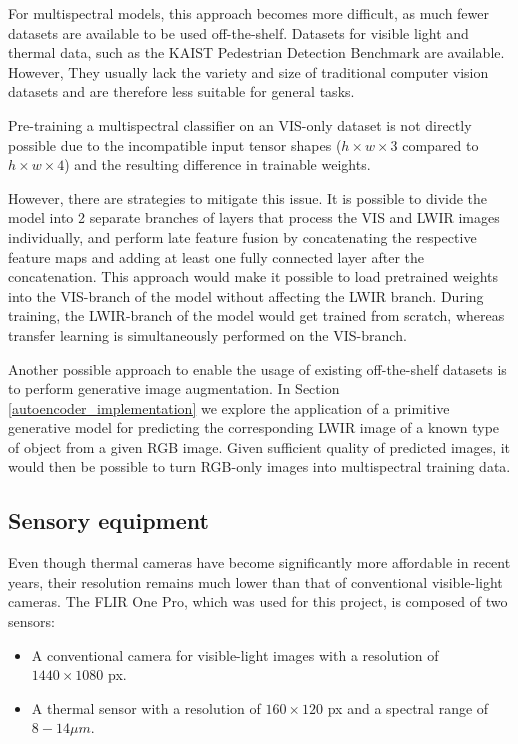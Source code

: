 \documentclass{l4proj}
\begin{document}
For multispectral models, this approach becomes more difficult, as much fewer datasets are available to be used off-the-shelf. Datasets for visible light and thermal data, such as the KAIST Pedestrian Detection Benchmark \citep{hwang_multispectral_2015} are available. However, They usually lack the variety and size of traditional computer vision datasets and are therefore less suitable for general tasks.

Pre-training a multispectral classifier on an VIS-only dataset is not directly possible due to the incompatible input tensor shapes ($h \times w \times 3$ compared to $h \times w \times 4$) and the resulting difference in trainable weights.

However, there are strategies to mitigate this issue. It is possible to divide the model into 2 separate branches of layers that process the VIS and LWIR images individually, and perform late feature fusion by concatenating the respective feature maps and adding at least one fully connected layer after the concatenation. This approach would make it possible to load pretrained weights into the VIS-branch of the model without affecting the LWIR branch. During training, the LWIR-branch of the model would get trained from scratch, whereas transfer learning is simultaneously performed on the VIS-branch.

Another possible approach to enable the usage of existing off-the-shelf datasets is to perform generative image augmentation. In Section \ref{autoencoder_implementation} we explore the application of a primitive generative model for predicting the corresponding LWIR image of a known type of object from a given RGB image. Given sufficient quality of predicted images, it would then be possible to turn RGB-only images into multispectral training data.


\subsection{Sensory equipment}

Even though thermal cameras have become significantly more affordable in recent years, their resolution remains much lower than that of conventional visible-light cameras. The FLIR One Pro, which was used for this project, is composed of two sensors:

\begin{itemize}
  \item A conventional camera for visible-light images with a resolution of $1440 \times 1080$ px.
  \item A thermal sensor with a resolution of $160 \times 120$ px and a spectral range of $8 - 14 \mu m$.
\end{itemize}
\end{document}
